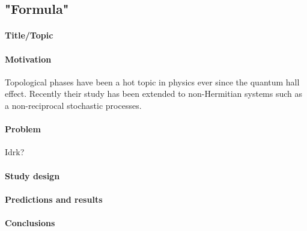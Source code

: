 \documentclass[11pt]{article}
\begin{document}
\subsection{"Formula"}
\paragraph{Title/Topic}
\paragraph{Motivation}
Topological phases have been a hot topic in physics ever since the quantum hall effect.
Recently their study has been extended to non-Hermitian systems such as a non-reciprocal stochastic processes.
\paragraph{Problem}
Idrk?
\paragraph{Study design}

\paragraph{Predictions and results}
\paragraph{Conclusions}
\end{document}
